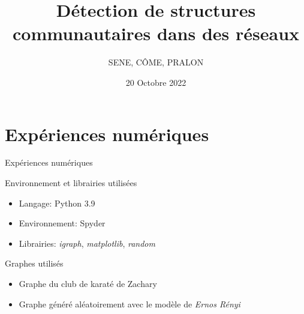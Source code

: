 \documentclass[11pt]{beamer}
\begin{document}
	\author{SENE, CÔME, PRALON}
	\title[Projet UE HAX907X]{Détection de structures communautaires dans des réseaux}
	\subtitle{}
	\date{20 Octobre 2022}
	\frame{\titlepage}
	
	
	\section{Expériences numériques}
	
	\begin{frame}{Expériences numériques}
		\begin{block}{Environnement et librairies utilisées}
			\begin{itemize}
				\item Langage: Python 3.9 \\
				\item Environnement: Spyder \\
				\item Librairies: \textit{igraph}, \textit{matplotlib}, \textit{random}
			\end{itemize} 
		\end{block}
		\begin{block}{Graphes utilisés}
			\begin{itemize}
				\item Graphe du club de karaté de Zachary \\
				\item Graphe généré aléatoirement avec le modèle de \textit{Ernos Rényi}
			\end{itemize}
		\end{block}
	\end{frame}
	
\end{document}
